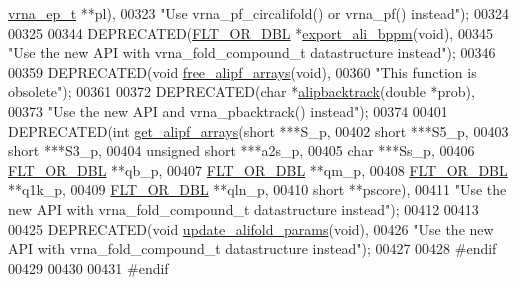 \begin{DoxyCode}
      \hyperlink{group__struct__utils_structvrna__elem__prob__s}{vrna\_ep\_t} **pl),
00323           \textcolor{stringliteral}{"Use vrna\_pf\_circalifold() or vrna\_pf() instead"});
00324 
00325 
00344 DEPRECATED(\hyperlink{group__data__structures_ga31125aeace516926bf7f251f759b6126}{FLT\_OR\_DBL} *\hyperlink{group__consensus__pf__fold_ga11b6ab8bd9be1821fea352b190a01cab}{export\_ali\_bppm}(\textcolor{keywordtype}{void}),
00345           \textcolor{stringliteral}{"Use the new API with vrna\_fold\_compound\_t datastructure instead"});
00346 
00359 DEPRECATED(\textcolor{keywordtype}{void}  \hyperlink{group__consensus__pf__fold_ga0c0498f35686e26b38ee460d3db1a661}{free\_alipf\_arrays}(\textcolor{keywordtype}{void}),
00360           \textcolor{stringliteral}{"This function is obsolete"});
00361 
00372 DEPRECATED(\textcolor{keywordtype}{char}  *\hyperlink{group__consensus__stochbt_ga0df40248788f0fb17ebdc59d74116d1c}{alipbacktrack}(\textcolor{keywordtype}{double} *prob),
00373           \textcolor{stringliteral}{"Use the new API and vrna\_pbacktrack() instead"});
00374 
00401 DEPRECATED(\textcolor{keywordtype}{int} \hyperlink{group__consensus__fold_ga5349960075b1847720a2e9df021e2675}{get\_alipf\_arrays}(\textcolor{keywordtype}{short} ***S\_p,
00402                      \textcolor{keywordtype}{short} ***S5\_p,
00403                      \textcolor{keywordtype}{short} ***S3\_p,
00404                      \textcolor{keywordtype}{unsigned} \textcolor{keywordtype}{short} ***a2s\_p,
00405                      \textcolor{keywordtype}{char} ***Ss\_p,
00406                      \hyperlink{group__data__structures_ga31125aeace516926bf7f251f759b6126}{FLT\_OR\_DBL} **qb\_p,
00407                      \hyperlink{group__data__structures_ga31125aeace516926bf7f251f759b6126}{FLT\_OR\_DBL} **qm\_p,
00408                      \hyperlink{group__data__structures_ga31125aeace516926bf7f251f759b6126}{FLT\_OR\_DBL} **q1k\_p,
00409                      \hyperlink{group__data__structures_ga31125aeace516926bf7f251f759b6126}{FLT\_OR\_DBL} **qln\_p,
00410                      \textcolor{keywordtype}{short} **pscore),
00411           \textcolor{stringliteral}{"Use the new API with vrna\_fold\_compound\_t datastructure instead"});
00412 
00413 
00425 DEPRECATED(\textcolor{keywordtype}{void} \hyperlink{group__consensus__fold_gac484c6bd429bafbd353b91044508d8e9}{update\_alifold\_params}(\textcolor{keywordtype}{void}),
00426           \textcolor{stringliteral}{"Use the new API with vrna\_fold\_compound\_t datastructure instead"});
00427 
00428 \textcolor{preprocessor}{#endif}
00429 
00430 
00431 \textcolor{preprocessor}{#endif}
\end{DoxyCode}
